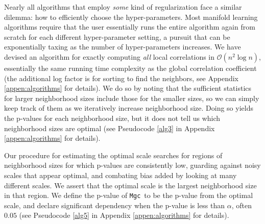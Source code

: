 \documentclass[11pt]{article}
\newcommand{\note}[2][]{\added[#1,remark={#2}]{}}
\providecommand{\sct}[1]{{\sc \texttt{#1}}}
\providecommand{\mc}[1]{\mathcal{#1}}
\newcommand{\Mgc}{\sct{Mgc}}
\newcommand{\jv}[1]{{\note{jv: #1}}}
\newcommand{\cs}[1]{{\note{cs: #1}}}
\begin{document}
Nearly all algorithms that employ \emph{some} kind of regularization face a similar dilemma: how to efficiently choose the hyper-parameters. 
Most  manifold learning algorithms require that the user essentially runs the entire algorithm again from scratch for each different hyper-parameter setting, a pursuit that can be exponentially taxing as the number of hyper-parameters increases.
We have devised an algorithm for exactly computing \emph{all} local correlations in $\mc{O}(n^2 \log n)$, essentially the same running time complexity as the global correlation coefficient (the additional log factor is for sorting to find the neighbors, see Appendix \ref{appen:algorithms} for details).  
We do so by noting that the sufficient statistics for larger neighborhood sizes include those for the smaller sizes, so we can simply keep track of them as we iteratively increase neighborhood size. Doing so yields the p-values for each neighborhood size, but it does not tell us which neighborhood sizes are optimal (see Pseudocode \ref{alg3} in Appendix \ref{appen:algorithms} for details).
\cs{seemed redundant: which allows our definition of local correlations to be an efficient and general tool in data analysis.}

\cs{removed because i don't think our readership cares much about that setting: If the distribution of the data is already known (of course, this is only for simulations), the optimal scale for \Mgc~can be easily determined via simulation.  When the distribution of data is unknown,} 
Our procedure for estimating the optimal scale searches for regions of neighborhood sizes for which p-values are consistently low, guarding against noisy scales that appear optimal, and combating bias added by looking at many different scales.   
\jv{this stuff was confusing for me: if the underlying joint distribution is known, or multiple dependent data are already given, the true optimal scale can be derived by maximizing the testing powers among all local correlations; if there is only one pair of observations with unknown underlying model, the optimal scale can be reasonably approximated based on p-values of all local correlations from the permutation test. }
% 
We assert that the optimal scale is the largest neighborhood size in that region.
\cs{deleted: we may use the permutation test to calculate the \Mgc~p-value (i.e., the p-value of the optimal local correlation),} 
We define the p-value of \Mgc~to be the p-value from the optimal scale, and declare significant dependency when the p-value is less than $\alpha$, often $0.05$ (see Pseudocode \ref{alg5} in Appendix \ref{appen:algorithms} for details). 
\end{document}
